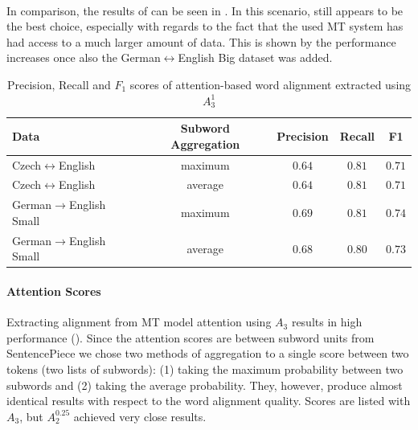 \paragraph{\fastalign{}} In comparison, the results of \fastalign{} can be seen in . In this scenario, \fastalign{} still appears to be the best choice, especially with regards to the fact that the used MT system has had access to a much larger amount of data. This is shown by the performance increases once also the German$\leftrightarrow$English Big dataset was added.

\begin{table}[h!]
    \center
    \begin{tabular}{lcccc}
        \toprule
        Data & Subword Aggregation & Precision & Recall & F1 \\
        \midrule
        Czech$\leftrightarrow$English & maximum & $0.64$ & $0.81$ & $0.71$ \\
        Czech$\leftrightarrow$English & average & $0.64$ & $0.81$ & $0.71$ \\
        German$\rightarrow$English Small\hspace*{-0.5cm}& maximum & $0.69$ & $0.81$ & $0.74$ \\
        German$\rightarrow$English Small\hspace*{-0.5cm}& average & $0.68$ & $0.80$ & $0.73$ \\
        \bottomrule
    \end{tabular}
    \caption{Precision, Recall and $F_1$ scores of attention-based word alignment extracted using $A_3^1$ \label{tab:individual_marian}}
\end{table}

\paragraph{Attention Scores} Extracting alignment from MT model attention using $A_3$ results in high performance (). Since the attention scores are between subword units from SentencePiece \citep{kudo2018sentencepiece} we chose two methods of aggregation to a single score between two tokens (two lists of subwords): (1) taking the maximum probability between two subwords and (2) taking the average probability. They, however, produce almost identical results with respect to the word alignment quality. Scores are listed with $A_3$, but $A_2^{0.25}$ achieved very close results.

